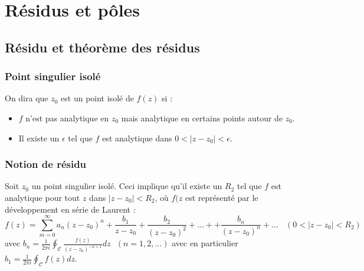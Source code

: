 \chapter{Résidus et p\^oles}

\section{Résidu et théorème des résidus}

	\subsection{Point singulier isolé}
	On dira que $z_0$ est un point isolé de $f(z)$ si :
	\begin{itemize}
	\item $f$ n'est pas analytique en $z_0$ mais analytique en certains points
	autour de $z_0$.
	\item Il existe un $\epsilon$ tel que $f$ est analytique dans $0<|z-z_0|<
	\epsilon$.
	\end{itemize}
	
	
	\subsection{Notion de résidu}
	Soit $z_0$ un point singulier isolé. Ceci implique qu'il existe un $R_2$ tel 
	que $f$ est analytique pour tout $z$ dans $|z-z_0| < R_2$, où $f(z$ est 
	représenté par le développement en série de Laurent :
	\begin{equation}
	f(z) = \sum_{m=0}^\infty a_n(z-z_0)^n + \frac{b_1}{z-z_0}+\frac{b_2}{(z-z_0)^2}
	+ \dots + + \frac{b_n}{(z-z_0)^n} + \dots\ \ \ \ (0<|z-z_0|<R_2)
	\end{equation}
	avec $b_n = \frac{1}{2\pi i}\oint_\mathcal{C}\frac{f(z)}{(z-z_0)^{-n+1}}dz\ \
	\ (n=1,2,\dots)$ avec en particulier $b_1 = \frac{1}{2\pi i}\oint_\mathcal{C}
	f(z) dz$.\\
	
	\ \\
	
